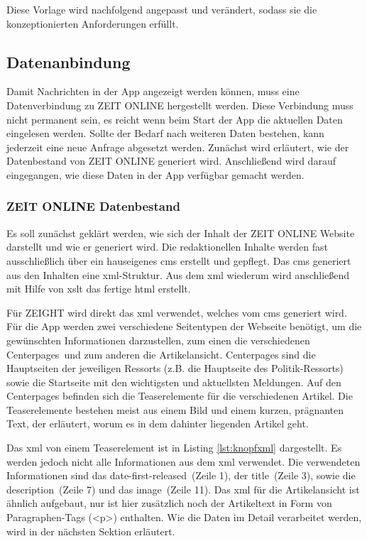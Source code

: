 \documentclass[12pt,a4paper,bibtotoc,abstracton]{scrartcl}
\begin{document}
Diese Vorlage wird nachfolgend angepasst und verändert, sodass sie die konzeptionierten Anforderungen erfüllt.

\subsection{Datenanbindung}
\label{subsec:datenanbindung}
Damit Nachrichten in der App angezeigt werden können, muss eine Datenverbindung zu ZEIT ONLINE hergestellt werden. Diese Verbindung muss nicht permanent sein, es reicht wenn beim Start der App die aktuellen Daten eingelesen werden. Sollte der Bedarf nach weiteren Daten bestehen, kann jederzeit eine neue Anfrage abgesetzt werden. Zunächst wird erläutert, wie der Datenbestand von ZEIT ONLINE generiert wird. Anschließend wird darauf eingegangen, wie diese Daten in der App verfügbar gemacht werden.

\subsubsection{ZEIT ONLINE Datenbestand}
\label{subsubsec:zondatenbestand}
Es soll zunächst geklärt werden, wie sich der Inhalt der ZEIT ONLINE Website darstellt und wie er generiert wird. Die redaktionellen Inhalte werden fast ausschließlich über ein hauseigenes \ac{cms} erstellt und gepflegt. Das \ac{cms} generiert aus den Inhalten eine \ac{xml}-Struktur. Aus dem \ac{xml} wiederum wird anschließend mit Hilfe von \ac{xslt} das fertige \ac{html} erstellt.

Für ZEIGHT wird direkt das \ac{xml} verwendet, welches vom \ac{cms} generiert wird. Für die App werden zwei verschiedene Seitentypen der Webseite benötigt, um die gewünschten Informationen darzustellen, zum einen die verschiedenen \glqq Centerpages\grqq\ und zum anderen die Artikelansicht. Centerpages sind die Hauptseiten der jeweiligen Ressorts (z.B. die Hauptseite des Politik-Ressorts) sowie die Startseite mit den wichtigsten und aktuellsten Meldungen. Auf den Centerpages befinden sich die Teaserelemente für die verschiedenen Artikel. Die Teaserelemente bestehen meist aus einem Bild und einem kurzen, prägnanten Text, der erläutert, worum es in dem dahinter liegenden Artikel geht.\\

\begin{minipage}{\linewidth}

\end{minipage}

Das \ac{xml} von einem Teaserelement ist in Listing \ref{lst:knopfxml} dargestellt. Es werden jedoch nicht alle Informationen aus dem \ac{xml} verwendet. Die verwendeten Informationen sind das \glqq date-first-released\grqq\ (Zeile 1), der \glqq title\grqq\ (Zeile 3), sowie die \glqq description\grqq\ (Zeile 7) und das \glqq image\grqq\ (Zeile 11). Das \ac{xml} für die Artikelansicht ist ähnlich aufgebaut, nur ist hier zusätzlich noch der Artikeltext in Form von Paragraphen-Tags (<p>) enthalten. Wie die Daten im Detail verarbeitet werden, wird in der nächsten Sektion erläutert.
\end{document}
